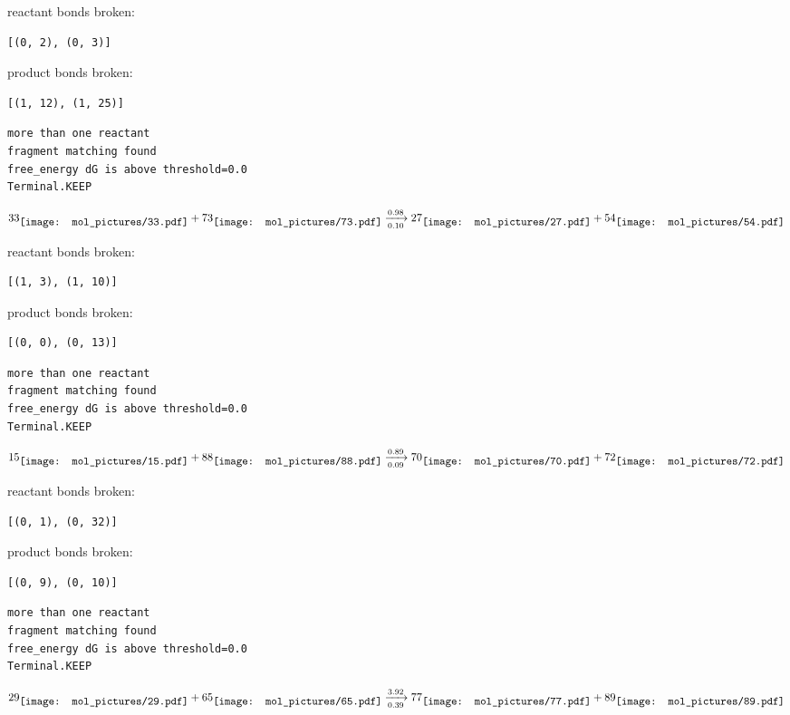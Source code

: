 \documentclass{article}
\begin{document}
reactant bonds broken:\begin{verbatim}
[(0, 2), (0, 3)]
\end{verbatim}
product bonds broken:\begin{verbatim}
[(1, 12), (1, 25)]
\end{verbatim}




\vspace{1cm}
\begin{verbatim}
more than one reactant
fragment matching found
free_energy dG is above threshold=0.0
Terminal.KEEP
\end{verbatim}
$$
33
\raisebox{-.5\height}{\texttt{[image: mol\_pictures/33.pdf]}}
+
73
\raisebox{-.5\height}{\texttt{[image: mol\_pictures/73.pdf]}}
\xrightarrow[0.10]{0.98}
27
\raisebox{-.5\height}{\texttt{[image: mol\_pictures/27.pdf]}}
+
54
\raisebox{-.5\height}{\texttt{[image: mol\_pictures/54.pdf]}}
$$


reactant bonds broken:\begin{verbatim}
[(1, 3), (1, 10)]
\end{verbatim}
product bonds broken:\begin{verbatim}
[(0, 0), (0, 13)]
\end{verbatim}




\vspace{1cm}
\begin{verbatim}
more than one reactant
fragment matching found
free_energy dG is above threshold=0.0
Terminal.KEEP
\end{verbatim}
$$
15
\raisebox{-.5\height}{\texttt{[image: mol\_pictures/15.pdf]}}
+
88
\raisebox{-.5\height}{\texttt{[image: mol\_pictures/88.pdf]}}
\xrightarrow[0.09]{0.89}
70
\raisebox{-.5\height}{\texttt{[image: mol\_pictures/70.pdf]}}
+
72
\raisebox{-.5\height}{\texttt{[image: mol\_pictures/72.pdf]}}
$$


reactant bonds broken:\begin{verbatim}
[(0, 1), (0, 32)]
\end{verbatim}
product bonds broken:\begin{verbatim}
[(0, 9), (0, 10)]
\end{verbatim}




\vspace{1cm}
\begin{verbatim}
more than one reactant
fragment matching found
free_energy dG is above threshold=0.0
Terminal.KEEP
\end{verbatim}
$$
29
\raisebox{-.5\height}{\texttt{[image: mol\_pictures/29.pdf]}}
+
65
\raisebox{-.5\height}{\texttt{[image: mol\_pictures/65.pdf]}}
\xrightarrow[0.39]{3.92}
77
\raisebox{-.5\height}{\texttt{[image: mol\_pictures/77.pdf]}}
+
89
\raisebox{-.5\height}{\texttt{[image: mol\_pictures/89.pdf]}}
$$
\end{document}
